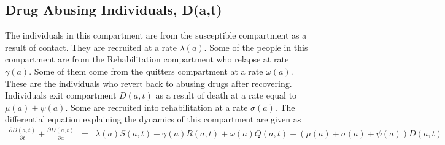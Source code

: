 


\subsection{Drug Abusing Individuals, D(a,t)}

The individuals in this compartment are from the susceptible compartment as a result of contact. They are recruited at a rate $\lambda(a)$. Some of the people in this compartment are from the Rehabilitation compartment who relapse at rate $\gamma (a)$. Some of them come from the quitters compartment at a rate $\omega (a)$. These are the individuals who revert back to abusing drugs after recovering.
Individuals exit compartment $D(a,t)$ as a result of death at a rate equal to $\mu(a)+ \psi (a)$. Some are recruited into rehabilitation at a rate $\sigma(a)$.
The differential equation explaining the dynamics of this compartment are given as
\begin{eqnarray}
\frac{\partial D(a,t)}{\partial t} + \frac{\partial D(a,t)}{\partial a}& = &\lambda(a) S(a,t)+ \gamma(a) R(a,t) + \omega(a) Q(a,t)-(\mu(a)  +\sigma(a)+ \psi(a))D(a,t)
\end{eqnarray}

